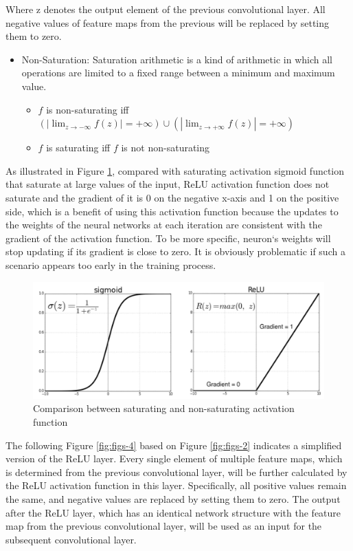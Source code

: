 \documentclass[]{krantz}
\providecommand{\tightlist}{%
  \setlength{\itemsep}{0pt}\setlength{\parskip}{0pt}}
\begin{document}
Where z denotes the output element of the previous convolutional layer. All negative values of feature maps from the previous will be replaced by setting them to zero.

\begin{itemize}
\tightlist
\item
  Non-Saturation: Saturation arithmetic is a kind of arithmetic in which all operations are limited to a fixed range between a minimum and maximum value.

  \begin{itemize}
  \tightlist
  \item
    \(f\) is non-saturating iff \((|\displaystyle{\lim_{z \to -\infty}f(z)}|=+\infty) \cup (|\displaystyle{\lim_{z \to +\infty}f(z)}|=+\infty)\)
  \item
    \(f\) is saturating iff \(f\) is not non-saturating
  \end{itemize}
\end{itemize}

As illustrated in Figure \ref{fig:figs-3}, compared with saturating activation sigmoid function that saturate at large values of the input, ReLU activation function does not saturate\citep{Krizhevsky2012ImageNetCW} and the gradient of it is 0 on the negative x-axis and 1 on the positive side, which is a benefit of using this activation function because the updates to the weights of the neural networks at each iteration are consistent with the gradient of the activation function. To be more specific, neuron`s weights will stop updating if its gradient is close to zero. It is obviously problematic if such a scenario appears too early in the training process.

\begin{figure}[ht]

{\centering \includegraphics[width=0.6\linewidth]{figures/01-03-cnns-and-their-applications-in-nlp/ReLU_sigmoid} 

}

\caption{Comparison between saturating and non-saturating activation function }\label{fig:figs-3}
\end{figure}

The following Figure \ref{fig:figs-4} based on Figure \ref{fig:figs-2} indicates a simplified version of the ReLU layer. Every single element of multiple feature maps, which is determined from the previous convolutional layer, will be further calculated by the ReLU activation function in this layer. Specifically, all positive values remain the same, and negative values are replaced by setting them to zero. The output after the ReLU layer, which has an identical network structure with the feature map from the previous convolutional layer, will be used as an input for the subsequent convolutional layer.
\end{document}
